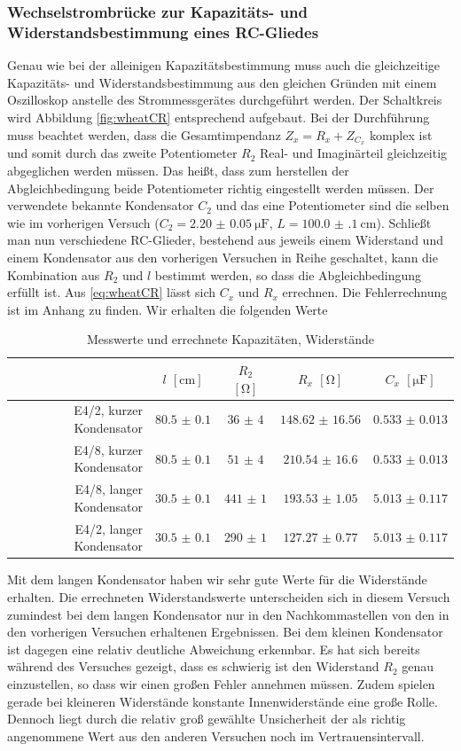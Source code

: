 \subsubsection{Wechselstrombrücke zur Kapazitäts- und Widerstandsbestimmung eines RC-Gliedes}
Genau wie bei der alleinigen Kapazitätsbestimmung muss auch die gleichzeitige Kapazitäts- und Widerstandsbestimmung aus den gleichen Gründen mit einem Oszilloskop anstelle des Strommessgerätes durchgeführt werden. Der Schaltkreis wird Abbildung \ref{fig:wheatCR} entsprechend aufgebaut. Bei der Durchführung muss beachtet werden, dass die Gesamtimpendanz $ Z_x = R_x + Z_{C_x} $ komplex ist und somit durch das zweite Potentiometer $ R_2 $ Real- und Imaginärteil gleichzeitig abgeglichen werden müssen. Das heißt, dass zum herstellen der Abgleichbedingung beide Potentiometer richtig eingestellt werden müssen. Der verwendete bekannte Kondensator $ C_2 $ und das eine Potentiometer sind die selben wie im vorherigen Versuch ($ C_2 = \SI{2.20(5)}{\micro\farad} $, $ L = \SI{100.0(1)}{\centi\meter} $). Schließt man nun verschiedene RC-Glieder, bestehend aus jeweils einem Widerstand und einem Kondensator aus den vorherigen Versuchen in Reihe geschaltet, kann die Kombination aus $ R_2 $ und $ l $ bestimmt werden, so dass die Abgleichbedingung erfüllt ist. Aus \eqref{eq:wheatCR} lässt sich $ C_x $ und $ R_x $ errechnen. Die Fehlerrechnung ist im Anhang zu finden. Wir erhalten die folgenden Werte
\begin{table}[H]
	\centering
	\begin{tabular}{r|cccc}
		& $ l $ $ [\si{\centi\meter}] $ & $ R_2 $ $ [\si{\ohm}] $ & $ R_x $ $ [\si{\ohm}] $ & $ C_x $ $ [\si{\micro\farad}] $  \\\hline
		E4/2, kurzer Kondensator & $ \num{80.5(01)} $ & $ \num{36(4)} $ & $ \num{148.62(1656)} $ & $ \num{0.533(0013)} $\\
		E4/8, kurzer Kondensator & $ \num{80.5(01)} $ & $ \num{51(4)} $ & $ \num{210.54(1660)} $ & $ \num{0.533(0013)} $\\
		E4/8, langer Kondensator & $ \num{30.5(01)} $ & $ \num{441(1)} $ & $ \num{193.53(105)} $ & $ \num{5.013(0117)} $\\
		E4/2, langer Kondensator & $ \num{30.5(01)} $ & $ \num{290(1)} $ & $ \num{127.27(077)} $ & $ \num{5.013(0117)} $\\
	\end{tabular}
	\caption{Messwerte und errechnete Kapazitäten, Widerstände}
\end{table}
Mit dem langen Kondensator haben wir sehr gute Werte für die Widerstände erhalten. Die errechneten Widerstandswerte unterscheiden sich in diesem Versuch zumindest bei dem langen Kondensator nur in den Nachkommastellen von den in den vorherigen Versuchen erhaltenen Ergebnissen. Bei dem kleinen Kondensator ist dagegen eine relativ deutliche Abweichung erkennbar. Es hat sich bereits während des Versuches gezeigt, dass es schwierig ist den Widerstand $ R_2 $ genau einzustellen, so dass wir einen großen Fehler annehmen müssen. Zudem spielen gerade bei kleineren Widerstände konstante Innenwiderstände eine große Rolle. Dennoch liegt durch die relativ groß gewählte Unsicherheit der als richtig angenommene Wert aus den anderen Versuchen noch im Vertrauensintervall. \\

